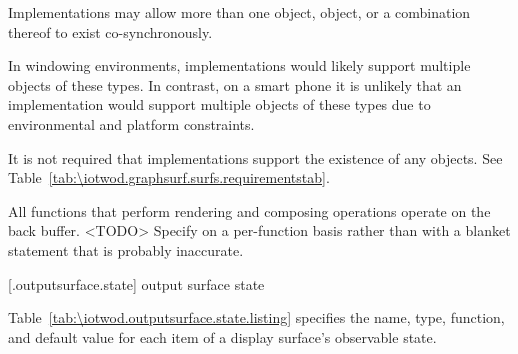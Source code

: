 \pnum
Implementations may allow more than one  object,  object, or a combination thereof to exist co-synchronously. \begin{note}
In windowing environments, implementations would likely support multiple objects of these types. In contrast, on a smart phone it is unlikely that an implementation would support multiple objects of these types due to environmental and platform constraints.
\end{note}

\pnum
It is not required that implementations support the existence of any  objects. See Table~\ref{tab:\iotwod.graphsurf.surfs.requirementstab}.

\pnum
All functions that perform rendering and composing operations operate on the back buffer. <TODO> Specify on a per-function basis rather than with a blanket statement that is probably inaccurate.

 [\iotwod.outputsurface.state] {output surface state}

\pnum
Table~\ref{tab:\iotwod.outputsurface.state.listing} specifies the name, type, function, and default value for each item of a display surface's observable state.

